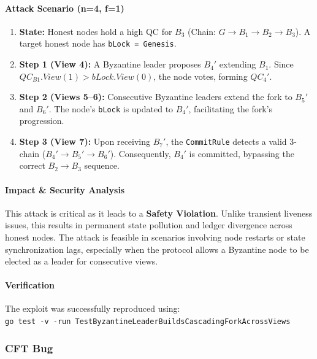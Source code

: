 \documentclass{article}
\theoremstyle{plain}
\theoremstyle{definition}
\theoremstyle{remark}
\begin{document}
{\paragraph{Attack Scenario (n=4, f=1)}
\begin{enumerate}
    \item \textbf{State:} Honest nodes hold a high QC for $B_3$ (Chain: $G \rightarrow B_1 \rightarrow B_2 \rightarrow B_3$). A target honest node has \texttt{bLock = Genesis}.
    \item \textbf{Step 1 (View 4):} A Byzantine leader proposes $B_4'$ extending $B_1$. Since $QC_{B1}.View (1) > bLock.View (0)$, the node votes, forming $QC_4'$.
    \item \textbf{Step 2 (Views 5--6):} Consecutive Byzantine leaders extend the fork to $B_5'$ and $B_6'$. The node's \texttt{bLock} is updated to $B_4'$, facilitating the fork's progression.
    \item \textbf{Step 3 (View 7):} Upon receiving $B_7'$, the \texttt{CommitRule} detects a valid 3-chain ($B_4' \rightarrow B_5' \rightarrow B_6'$). Consequently, $B_4'$ is committed, bypassing the correct $B_2 \rightarrow B_3$ sequence.
\end{enumerate}

\paragraph{Impact \& Security Analysis}
This attack is critical as it leads to a \textbf{Safety Violation}. Unlike transient liveness issues, this results in permanent state pollution and ledger divergence across honest nodes. The attack is feasible in scenarios involving node restarts or state synchronization lags, especially when the protocol allows a Byzantine node to be elected as a leader for consecutive views.

\paragraph{Verification}
The exploit was successfully reproduced using:\\
\texttt{go test -v -run TestByzantineLeaderBuildsCascadingForkAcrossViews}
}


\subsubsection{CFT Bug}
\label{appendsec:cftbug}
\end{document}
